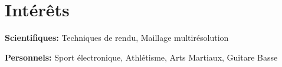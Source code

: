 \documentclass[]{friggeri-cv} %
\begin{document}

\section{Intérêts}

\textbf{Scientifiques:} Techniques de rendu, Maillage multirésolution

\textbf{Personnels:} Sport électronique, Athlétisme, Arts Martiaux, Guitare Basse

\end{document}
